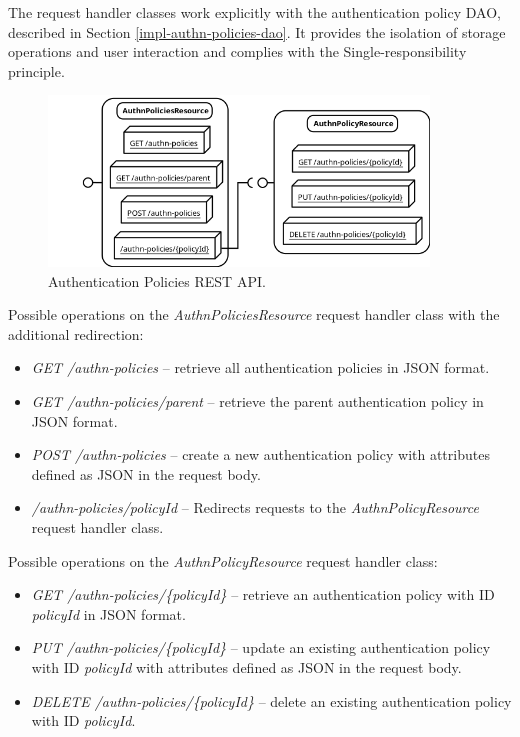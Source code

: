 The request handler classes work explicitly with the authentication policy DAO, described in Section \ref{impl-authn-policies-dao}.
It provides the isolation of storage operations and user interaction and complies with the Single-responsibility principle.\cite{impl-single-responsibility}

\begin{figure}[htbp]
  \centering
  \includegraphics[width=0.9\textwidth]{img/sections/6-implementation/rest.png}
  \caption{Authentication Policies REST API.}
  \label{fig:impl-authn-policies-rest}
\end{figure}

Possible operations on the \textit{AuthnPoliciesResource} request handler class with the additional redirection:
\begin{itemize}
    \item \textit{GET /authn-policies} -- retrieve all authentication policies in JSON format.
    \item \textit{GET /authn-policies/parent} -- retrieve the parent authentication policy in JSON format.
    \item \textit{POST /authn-policies} -- create a new authentication policy with attributes defined as JSON in the request body.  
    \item \textit{/authn-policies/{policyId}} -- Redirects requests to the \textit{AuthnPolicyResource} request handler class.
\end{itemize}

Possible operations on the \textit{AuthnPolicyResource} request handler class:

\begin{itemize}
    \item \textit{GET /authn-policies/\{policyId\}} -- retrieve an authentication policy with ID \textit{policyId} in JSON format.
    \item \textit{PUT /authn-policies/\{policyId\}} -- update an existing authentication policy with ID \textit{policyId} with attributes defined as JSON in the request body.
    \item \textit{DELETE /authn-policies/\{policyId\}} -- delete an existing authentication policy with ID \textit{policyId}.
\end{itemize}


